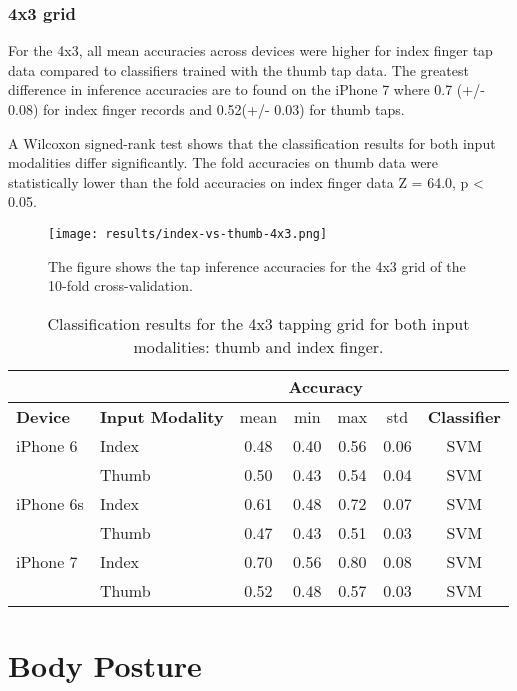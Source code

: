 \begin{appendix}
\subsubsection*{4x3 grid}
For the 4x3, all mean accuracies across devices were higher for index finger tap data compared to classifiers trained with the thumb tap data. The greatest difference in inference accuracies are to found on the iPhone 7 where 0.7 (+/- 0.08) for index finger records and 0.52(+/- 0.03) for thumb taps.

A Wilcoxon signed-rank test shows that the classification results for both input modalities differ significantly. The fold accuracies on thumb data were statistically lower than the fold accuracies on index finger data Z = 64.0, p < 0.05.


\begin{figure}[h!]
  \centering
  \texttt{[image: results/index-vs-thumb-4x3.png]}
  \caption{The figure shows the tap inference accuracies for the 4x3 grid of the 10-fold cross-validation.} \label{fig:participation}
\end{figure}

\begin{table}[h!]
  \centering
\begin{tabular}{|l|l|c|c|c|c|c|}
  \cline{3-6}
  \multicolumn{2}{c}{} & \multicolumn{4}{|c|}{\textbf{Accuracy}}  \\
  \hline
  \textbf{Device} & \textbf{Input Modality} & mean &   min &   max  & std &  \textbf{Classifier} \\
  \hline
	iPhone 6 & Index &      0.48 &     0.40 &     0.56 &     0.06 &  SVM \\
	& Thumb &      0.50 &     0.43 &     0.54 &     0.04 &  SVM \\
	\hline
iPhone 6s & Index &      0.61 &     0.48 &     0.72 &     0.07 &  SVM \\
	& Thumb &      0.47 &     0.43 &     0.51 &     0.03 &  SVM \\
	\hline
	iPhone 7 & Index &      0.70 &     0.56 &     0.80 &     0.08 &  SVM \\
	& Thumb &      0.52 &     0.48 &     0.57 &     0.03 &  SVM \\
	\hline
\end{tabular}
  \caption{Classification results for the 4x3 tapping grid for both input modalities: thumb and index finger.}
\end{table}

\section*{Body Posture}

\end{appendix}

